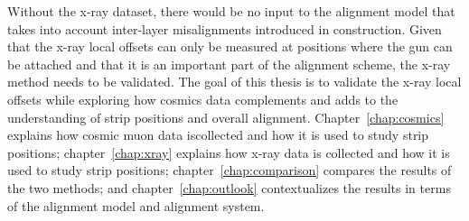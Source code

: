 Without the x-ray dataset, there would be no input to the alignment model that takes into account inter-layer misalignments introduced in construction. Given that the x-ray local offsets can only be measured at positions where the gun can be attached and that it is an important part of the alignment scheme, the x-ray method needs to be validated. The goal of this thesis is to validate the x-ray local offsets while exploring how cosmics data complements and adds to the understanding of strip positions and overall alignment. Chapter~\ref{chap:cosmics} explains how cosmic muon data iscollected and how it is used to study strip positions; chapter~\ref{chap:xray} explains how x-ray data is collected and how it is used to study strip positions; chapter~\ref{chap:comparison} compares the results of the two methods; and chapter~\ref{chap:outlook} contextualizes the results in terms of the alignment model and alignment system.
































